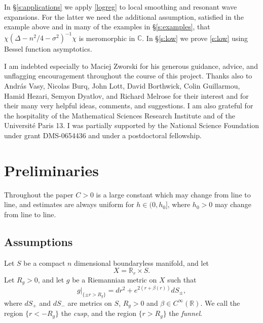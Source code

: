\documentclass[reqno, 12pt]{amsart}
\newcommand \R {\mathbb{R}}
\newcommand \C {\mathbb{C}}
\theoremstyle{definition}
\numberwithin{equation}{section}
\numberwithin{prop}{section}
\numberwithin{figure}{section}
\begin{document}

In \S\ref{s:applications} we apply \eqref{logreg} to local smoothing and resonant wave expansions. For the latter  we need the additional assumption, satisfied in the example above and in many of the examples in \S\ref{s:examples}, that $\chi (\Delta - n^2/4 - \sigma^2)^{-1} \chi$ is meromorphic in $\C$. %
In \S\ref{s:low} we prove \eqref{e:low} using Bessel function asymptotics.

I am indebted especially to Maciej Zworski for his generous guidance, advice, and unflagging encouragement throughout the course of this project. Thanks also to Andr\'as Vasy, Nicolas Burq, John Lott, David Borthwick, Colin Guillarmou,  Hamid Hezari,  Semyon Dyatlov, and Richard Melrose for their interest and for their many very helpful ideas, comments, and suggestions. 
 I am also grateful for the hospitality of the Mathematical Sciences Research Institute and of the Universit\'e Paris 13.
 I was partially supported by the National Science Foundation under grant DMS-0654436 and under a postdoctoral fellowship.

\section{Preliminaries}\label{s:prelim}

Throughout the paper $C>0$ is a large constant which may change from line to line, and estimates are always uniform for $h \in (0,h_0]$, where $h_0>0$  may change from line to line.

\subsection{Assumptions}\label{s:assumptions}
Let $S$ be a compact $n$ dimensional boundaryless manifold, and let
\[X = \R_r \times S.\]
Let $R_g > 0$, and let $g$ be a Riemannian metric on $X$ such that 
\begin{equation}\label{e:metricinfinity}
g|_{\{\pm r > R_g\}} = dr^2 + e^{2(r + \beta(r))}dS_\pm,
\end{equation}
where $dS_+$ and $dS_-$ are metrics on $S$, $R_g>0$ and $\beta \in C^\infty(\R)$. We call the region $\{r < -R_g\}$ the \textit{cusp}, and the region $\{r > R_g\}$ the \textit{funnel}. 
\end{document}
